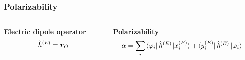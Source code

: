 \begin{frame}
\frametitle{Polarizability}
\begin{columns}

\begin{column}[b]{0.3\textwidth}
\centering
\textbf{Electric dipole operator}
\begin{equation}
    \nonumber
    \hat{h}^{(E)} = \boldsymbol{r}_O
\end{equation}
\end{column}


\begin{column}[b]{0.7\textwidth}
\centering
\textbf{Polarizability}
\begin{equation}
    \nonumber
    \alpha 
    = \sum_i 
    \bra{\varphi_i}\hat{h}^{(E)} \ket{x_i^{(E)}} + 
    \bra{y_i^{(E)}}\hat{h}^{(E)}\ket{\varphi_i}
\end{equation}
\end{column}
\end{columns}

\vspace{5mm}



\end{frame}
